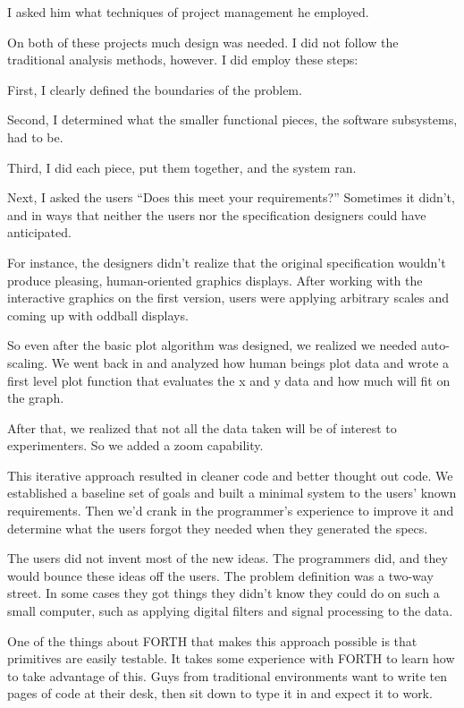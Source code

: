 I asked him what techniques of project management he employed.

\begin{tfquot}
On both of these projects much design was needed. I did not follow the
traditional analysis methods, however. I did employ these steps:

First, I clearly defined the boundaries of the problem.

Second, I determined what the smaller functional pieces, the software
subsystems, had to be.

Third, I did each piece, put them together, and the system ran.

Next, I asked the users ``Does this meet your requirements?'' Sometimes it
didn't, and in ways that neither the users nor the specification designers
could have anticipated.

For instance, the designers didn't realize that the original
specification wouldn't produce pleasing, human-oriented graphics
displays. After working with the interactive graphics on the first
version, users were applying arbitrary scales and coming up with
oddball displays.

So even after the basic plot algorithm was designed, we realized we
needed auto-scaling. We went back in and analyzed how human beings
plot data and wrote a first level plot function that evaluates the x
and y data and how much will fit on the graph.

After that, we realized that not all the data taken will be of
interest to experimenters. So we added a zoom capability.

This iterative approach resulted in cleaner code and better thought
out code. We established a baseline set of goals and built a minimal
system to the users' known requirements. Then we'd crank in the
programmer's experience to improve it and determine what the users
forgot they needed when they generated the specs.

The users did not invent most of the new ideas. The programmers did,
and they would bounce these ideas off the users. The problem
definition was a two-way street. In some cases they got things they
didn't know they could do on such a small computer, such as applying
digital filters and signal processing to the data.

One of the things about FORTH that makes this approach possible is
that primitives are easily testable. It takes some experience with
FORTH to learn how to take advantage of this. Guys from traditional
environments want to write ten pages of code at their desk, then sit
down to type it in and expect it to work.


\end{tfquot}
